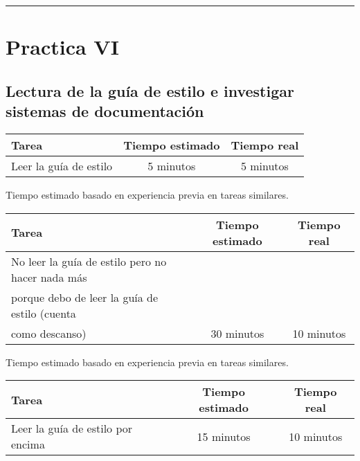 \documentclass[12pt,a4paper]{article}
\newcommand{\separadorseccion}{%
    \vspace{1em}
    \hrule
    \vspace{1em}
}
\begin{document}
\separadorseccion


\section{Practica VI}
\subsection{Lectura de la guía de estilo e investigar sistemas de documentación}
    \begin{center}
        \begin{tabular}{|l|c|c|}
            \hline
            \textbf{Tarea} & \textbf{Tiempo estimado} & \textbf{Tiempo real} \\
            \hline
            Leer la guía de estilo & 5 minutos & 5 minutos \\
            \hline
        \end{tabular}
    \end{center}
    \begin{center}
        Tiempo estimado basado en experiencia previa en tareas similares.
    \end{center}
    \begin{center}
        \begin{tabular}{|l|c|c|}
            \hline
            \textbf{Tarea} & \textbf{Tiempo estimado} & \textbf{Tiempo real} \\
            \hline
            No leer la guía de estilo pero no hacer nada más
\\porque debo de leer la guía de estilo (cuenta
\\como descanso) & 30 minutos & 10 minutos \\
            \hline
        \end{tabular}
    \end{center}
    \begin{center}
        Tiempo estimado basado en experiencia previa en tareas similares.
    \end{center}
    \begin{center}
        \begin{tabular}{|l|c|c|}
            \hline
            \textbf{Tarea} & \textbf{Tiempo estimado} & \textbf{Tiempo real} \\
            \hline
            Leer la guía de estilo por encima & 15 minutos & 10 minutos \\
            \hline
        \end{tabular}
    \end{center}
\end{document}
